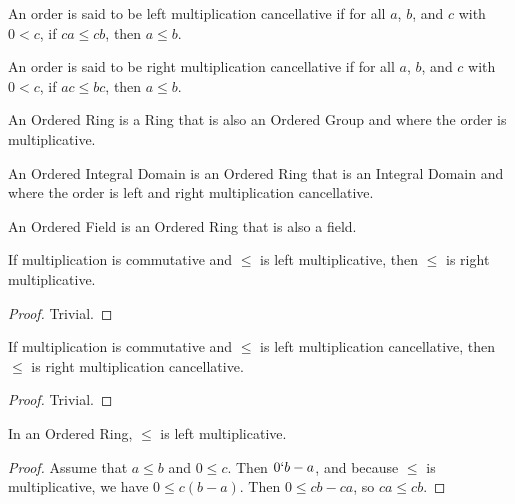 \documentclass[../../math.tex]{subfiles}
\begin{document}
\begin{class}
    An order is said to be left multiplication cancellative if for all $a$, $b$,
    and $c$ with $0 < c$, if $ca \leq cb$, then $a \leq b$.
\end{class}

\begin{class}
    An order is said to be right multiplication cancellative if for all $a$,
    $b$, and $c$ with $0 < c$, if $ac \leq bc$, then $a \leq b$.
\end{class}

\begin{class}
    An Ordered Ring is a Ring that is also an Ordered Group and where the order
    is multiplicative.
\end{class}

\begin{class}
    An Ordered Integral Domain is an Ordered Ring that is an Integral Domain and
    where the order is left and right multiplication cancellative.
\end{class}

\begin{class}
    An Ordered Field is an Ordered Ring that is also a field.
\end{class}

\begin{instance}
    If multiplication is commutative and $\leq$ is left multiplicative, then
    $\leq$ is right multiplicative.
\end{instance}
\begin{proof}
    Trivial.
\end{proof}

\begin{instance}
    If multiplication is commutative and $\leq$ is left multiplication
    cancellative, then $\leq$ is right multiplication cancellative.
\end{instance}
\begin{proof}
    Trivial.
\end{proof}

\begin{instance}
    In an Ordered Ring, $\leq$ is left multiplicative.
\end{instance}
\begin{proof}
    Assume that $a \leq b$ and $0 \leq c$.  Then $0 \lq b - a$, and because
    $\leq$ is multiplicative, we have $0 \leq c(b - a)$.  Then $0 \leq cb - ca$,
    so $ca \leq cb$.
\end{proof}
\end{document}
